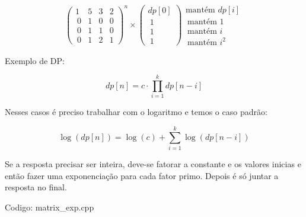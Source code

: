\documentclass[10pt, a4paper, oneside]{book}
\begin{document}
$$ \begin{pmatrix} 1&5&3&2 \\\ 0&1&0&0 \\\ 0&1&1&0 \\\ 0&1&2&1 \end{pmatrix}^n \times \begin{pmatrix} dp[0]   \\\ 1       \\\ 1       \\\ 1\end {pmatrix} \begin{matrix} \text{mantém } dp[i]   \\\ \text{mantém }1       \\\ \text{mantém }i       \\\ \text{mantém }i^2      \end {matrix} $$



\textbf{} 


Exemplo de DP:



$$ dp[n] = c \cdot \prod_{i=1}^{k} dp[n-i] $$



Nesses casos é preciso trabalhar com o logaritmo e temos o caso padrão:





$$ \log(dp[n]) = \log(c) + \sum_{i=1}^{k} \log(dp[n-i]) $$



Se a resposta precisar ser inteira, deve-se fatorar a constante e os valores inicias e então fazer uma exponenciação para cada fator primo. Depois é só juntar a resposta no final.

\hfill

Codigo: matrix\_exp.cpp
\end{document}

